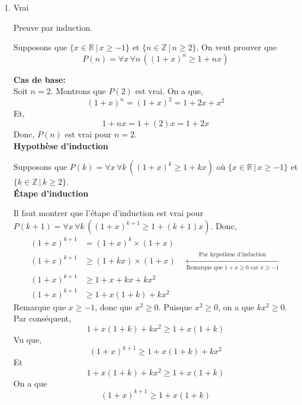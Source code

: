 \documentclass[12pt]{book}
\begin{document}
\newcommand{\reporttitle}{Devoir 2}
\newcommand{\reportauthorOne}{Kien Do}
\newcommand{\cidOne}{300163370}






\begin{enumerate}
    \item Vrai
    
    Preuve par induction.
    
    Supposons que $\{x \in \mathbb{R} \,|\, x \geq -1\}$ et $\{n \in \mathbb{Z} \,|\, n \geq 2\}$. On veut prouver que 
    $$P(n) = \forall x \, \forall n \, ((1+x)^n \geq 1+nx)$$
    
    \textbf{Cas de base:}\\
    Soit $n = 2$. Montrons que $P(2)$ est vrai. On a que,
    $$(1+x)^n = (1+x)^2 = 1 + 2x + x^2$$
    Et,
    $$1 + nx = 1 + (2)x = 1 + 2x$$
    Donc, $P(n)$ est vrai pour $n = 2$.\\
    
    \textbf{Hypothèse d'induction}
    
    Supposons que $P(k) = \forall x \, \forall k \, ((1+x)^k \geq 1+kx)$ où $\{x \in \mathbb{R} \,|\, x \geq -1\}$ et $\{k \in \mathbb{Z} \,|\, k \geq 2\}$.\\
    
    \textbf{Étape d'induction}
    
    Il faut montrer que l'étape d'induction est vrai pour $P(k+1) = \forall x \, \forall k \, ((1+x)^{k+1} \geq 1+(k+1)x)$. Donc,
    \begin{align*}
        (1+x)^{k+1} &= (1+x)^{k} \times (1+x) \\
        (1+x)^{k+1} &\geq (1+kx) \times (1+x) \quad \xleftarrow[\text{Remarque que $1+x \geq 0$ car $x \geq -1$}]{\text{Par hypothèse d'induction}}\\
        (1+x)^{k+1} &\geq 1 + x + kx + kx^2\\
        (1+x)^{k+1} &\geq 1 + x(1+k) + kx^2
    \end{align*}
    Remarque que $x \geq -1$, donc que $x^2 \geq 0$. Puisque $x^2 \geq 0$, on a que $kx^2 \geq 0$. Par conséquent,
    $$1 + x(1+k) + kx^2 \geq 1 + x(1+k)$$
    Vu que, $$(1+x)^{k+1} \geq 1 + x(1+k) + kx^2$$ 
    Et $$1 + x(1+k) + kx^2 \geq 1 + x(1+k)$$
    On a que $$(1+x)^{k+1} \geq 1 + x(1+k)$$
    

\end{enumerate}
\end{document}

